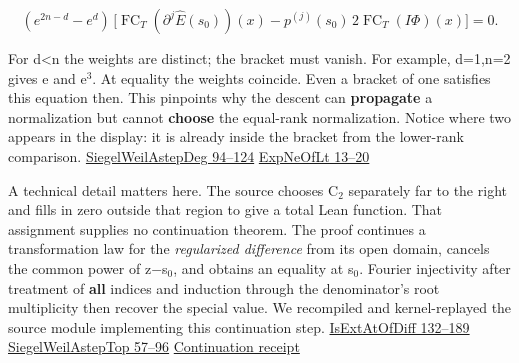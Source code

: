 \documentclass[11pt,letterpaper]{article}
\begin{document}
\[(e^{2n-d}-e^d)\,
 \Big[\operatorname{FC}_T(\partial^j \widehat{E}(s_0))(x)
 -p^{(j)}(s_0)\,2\operatorname{FC}_T(I\Phi{})(x)\Big]=0 .\]

For d<n the weights are distinct; the bracket must vanish. For example, d=1,n=2 gives e and e\ensuremath{{}^{3}}. At equality the weights coincide. Even a bracket of one satisfies this equation then. This pinpoints why the descent can \textbf{propagate} a normalization but cannot \textbf{choose} the equal-rank normalization. Notice where two appears in the display: it is already inside the bracket from the lower-rank comparison. \href{https://github.com/nousentllc/riemann-hypothesis/blob/40e56bab026552e089d7afcfeff08d2defb9c005/src/Development/AutomorphicArithmetic/Foundations/GaloisRepresentations/ThetaParseval/ThetaKernels/SiegelWeilAstepDeg.lean\#L94-L124}{SiegelWeilAstepDeg 94–124} \href{https://github.com/nousentllc/riemann-hypothesis/blob/40e56bab026552e089d7afcfeff08d2defb9c005/src/Development/WeilBound/CoreStatements/AutomorphicKernels/SiegelWeilFormula/AdelicDilations/ExpNeOfLt.lean\#L13-L20}{ExpNeOfLt 13–20}

A technical detail matters here. The source chooses C\ensuremath{{}_{2}} separately far to the right and fills in zero outside that region to give a total Lean function. That assignment supplies no continuation theorem. The proof continues a transformation law for the \emph{regularized difference} from its open domain, cancels the common power of z\ensuremath{-}s\ensuremath{{}_{0}}, and obtains an equality at s\ensuremath{{}_{0}}. Fourier injectivity after treatment of \textbf{all} indices and induction through the denominator’s root multiplicity then recover the special value. We recompiled and kernel-replayed the source module implementing this continuation step. \href{https://github.com/nousentllc/riemann-hypothesis/blob/40e56bab026552e089d7afcfeff08d2defb9c005/src/Development/WeilBound/CoreStatements/AutomorphicKernels/SiegelWeilFormula/AdelicDilations/IsExtAtOfDiff.lean\#L132-L189}{IsExtAtOfDiff 132–189} \href{https://github.com/nousentllc/riemann-hypothesis/blob/40e56bab026552e089d7afcfeff08d2defb9c005/src/Development/AutomorphicArithmetic/Foundations/GaloisRepresentations/ThetaParseval/ThetaKernels/SiegelWeilAstepTop.lean\#L57-L96}{SiegelWeilAstepTop 57–96} \href{https://github.com/nousentllc/riemann-hypothesis/blob/2c03d15e908bcbe4aae3c94a87c7ada402cd7911/research/uriel/experiments/siegel-weil-constant-term/continuation/receipt.json}{Continuation receipt}
\end{document}
